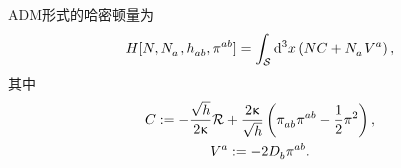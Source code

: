 		\begin{Property}
			ADM形式的哈密顿量为
			\begin{equation}
				H[N,\tensor{N}{_a}, \tensor{h}{_a_b}, \tensor{\pi}{^a^b}] = \int_{\spc} \dd[3]{x} \left( N C + \tensor{N}{_a} \tensor{V}{^a} \right), \label{ap-eq-ADM_H}
			\end{equation}
			其中
			\begin{gather}
				C \definedby - \frac{\sqrt{h}}{2\gkappa} \spacecurR + \frac{2\gkappa}{\sqrt{h}} \left( \tensor{\pi}{_a_b} \tensor{\pi}{^a^b} - \frac{1}{2} \pi^2 \right),\\
				\tensor{V}{^a} \definedby -2 \spaceD{b} \tensor{\pi}{^a^b}.
			\end{gather}
		\end{Property}

